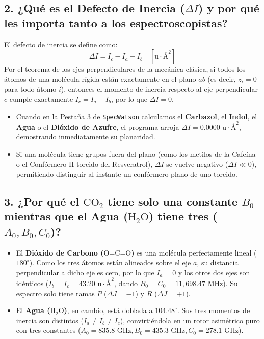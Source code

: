 \documentclass[11pt,letterpaper]{article}
\begin{document}
\subsection{2. ¿Qué es el Defecto de Inercia ($\Delta I$) y por qué les importa tanto a los espectroscopistas?}
El defecto de inercia se define como:
\begin{equation}
    \Delta I = I_c - I_a - I_b \quad [\text{u}\cdot\text{\AA}^2]
\end{equation}
Por el teorema de los ejes perpendiculares de la mecánica clásica, si todos los átomos de una molécula rígida están exactamente en el plano $ab$ (es decir, $z_i = 0$ para todo átomo $i$), entonces el momento de inercia respecto al eje perpendicular $c$ cumple exactamente $I_c = I_a + I_b$, por lo que \textbf{$\Delta I = 0$}.
\begin{itemize}[leftmargin=1.5em,itemsep=2pt]
    \item Cuando en la Pestaña 3 de \texttt{SpecWatson} calculamos el \textbf{Carbazol}, el \textbf{Indol}, el \textbf{Agua} o el \textbf{Dióxido de Azufre}, el programa arroja $\Delta I = 0.0000\text{ u}\cdot\text{\AA}^2$, demostrando inmediatamente su planaridad.
    \item Si una molécula tiene grupos fuera del plano (como los metilos de la Cafeína o el Confórmero II torcido del Resveratrol), $\Delta I$ se vuelve negativo ($\Delta I \ll 0$), permitiendo distinguir al instante un confórmero plano de uno torcido.
\end{itemize}

\subsection{3. ¿Por qué el $\text{CO}_2$ tiene solo una constante $B_0$ mientras que el Agua ($\text{H}_2\text{O}$) tiene tres ($A_0, B_0, C_0$)?}
\begin{itemize}[leftmargin=1.5em,itemsep=2pt]
    \item El \textbf{Dióxido de Carbono ($\text{O=C=O}$)} es una molécula perfectamente lineal ($180^\circ$). Como los tres átomos están alineados sobre el eje $a$, su distancia perpendicular a dicho eje es cero, por lo que $I_a = 0$ y los otros dos ejes son idénticos ($I_b = I_c = 43.20\text{ u}\cdot\text{\AA}^2$, dando $B_0 = C_0 = 11,698.47\text{ MHz}$). Su espectro solo tiene ramas $P$ ($\Delta J = -1$) y $R$ ($\Delta J = +1$).
    \item El \textbf{Agua ($\text{H}_2\text{O}$)}, en cambio, está doblada a $104.48^\circ$. Sus tres momentos de inercia son distintos ($I_a \neq I_b \neq I_c$), convirtiéndola en un rotor asimétrico puro con tres constantes ($A_0 = 835.8\text{ GHz}, B_0 = 435.3\text{ GHz}, C_0 = 278.1\text{ GHz}$).
\end{itemize}
\end{document}
